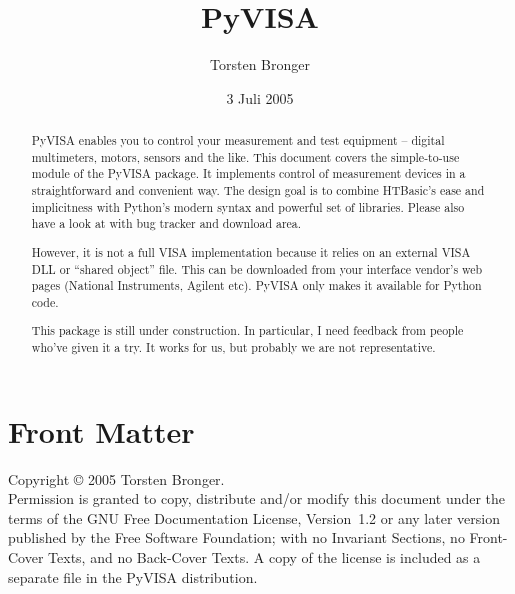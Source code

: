 \documentclass{howto}
\title{PyVISA}
\author{Torsten Bronger}
\date{3 Juli 2005}
\begin{document}
\maketitle

\ifhtml
\chapter*{Front Matter\label{front}}
\fi

Copyright \copyright{} 2005 Torsten Bronger.\\
Permission is granted to copy, distribute and/or modify this document under the
terms of the GNU Free Documentation License, Version~1.2 or any later version
published by the Free Software Foundation; with no Invariant Sections, no
Front-Cover Texts, and no Back-Cover Texts.  A copy of the license is included
as a separate file  in the PyVISA distribution.

\begin{abstract}

\noindent
PyVISA enables you to control your measurement and test equipment -- digital
multimeters, motors, sensors and the like.  This document covers the
simple-to-use  module of the PyVISA package.  It implements
control of measurement devices in a straightforward and convenient way.  The
design goal is to combine HTBasic's ease and implicitness with Python's modern
syntax and powerful set of libraries.  Please also have a look at
 with bug
tracker and download area.

However, it is not a full VISA implementation because it relies on an external
VISA DLL or ``shared object'' file.  This can be downloaded from your interface
vendor's web pages (National Instruments, Agilent etc).  PyVISA only makes it
available for Python code.

This package is still under construction.  In particular, I need feedback from
people who've given it a try.  It works for us, but probably we are not
representative.
\end{abstract}

\begin{samepage}
  \tableofcontents
\end{samepage}

\end{document}
